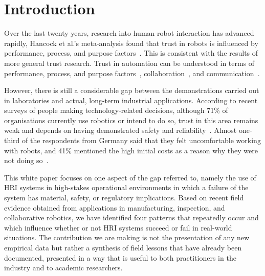 \documentclass[sigconf, nonacm] {acmart}
\begin{document}


\maketitle


\section{Introduction}
Over the last twenty years, research into human-robot interaction has advanced rapidly, Hancock et al.'s meta-analysis found that trust in robots is influenced by performance, process, and purpose factors~\cite{hancock2021evolving}. This is consistent with the results of more general trust research. Trust in automation can be understood in terms of performance, process, and purpose factors~\cite{lee2004trust}, collaboration~\cite{nikolaidis2017human}, and communication~\cite{arkin2018realtime}. 


However, there is still a considerable gap between the demonstrations carried out in laboratories and actual, long-term industrial applications. According to recent surveys of people making technology-related decisions, although 71\% of organisations currently use robotics or intend to do so, trust in this area remains weak and depends on having demonstrated safety and reliability~\cite{QNX2025,QNX2025de}. Almost one-third of the respondents from Germany said that they felt uncomfortable working with robots, and 41\% mentioned the high initial costs as a reason why they were not doing so~\cite{QNX2025,QNX2026InsideTheRobot,QNX2026ActiveSafety,QNX2026FunctionalSafety}.

This white paper focuses on one aspect of the gap referred to, namely the use of HRI systems in high-stakes operational environments in which a failure of the system has material, safety, or regulatory implications. Based on recent field evidence obtained from applications in manufacturing, inspection, and collaborative robotics, we have identified four patterns that repeatedly occur and which influence whether or not HRI systems succeed or fail in real-world situations. The contribution we are making is not the presentation of any new empirical data but rather a synthesis of field lessons that have already been documented, presented in a way that is useful to both practitioners in the industry and to academic researchers.
\end{document}
